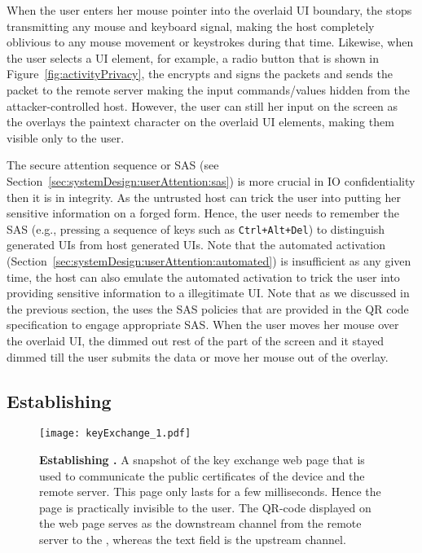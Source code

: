  When the user enters her mouse pointer into the overlaid UI boundary, the \device stops transmitting any mouse and keyboard signal, making the host completely oblivious to any mouse movement or keystrokes during that time. Likewise, when the user selects a UI element, for example, a radio button that is shown in Figure~\ref{fig:activityPrivacy}, the \device encrypts and signs the packets and sends the packet to the remote server making the input commands/values hidden from the attacker-controlled host. However, the user can still her input on the screen as the \device overlays the paintext character on the overlaid UI elements, making them visible only to the user. 

 The secure attention sequence or SAS (see Section~\ref{sec:systemDesign:userAttention:sas}) is more crucial in IO confidentiality then it is in integrity. As the untrusted host can trick the user into putting her sensitive information on a forged form. Hence, the user needs to remember the SAS (e.g., pressing a sequence of keys such as \texttt{Ctrl+Alt+Del}) to distinguish \device generated UIs from host generated UIs. Note that the automated activation (Section~\ref{sec:systemDesign:userAttention:automated}) is insufficient as any given time, the host can also emulate the automated activation to trick the user into providing sensitive information to a illegitimate UI. Note that as we discussed in the previous section, the \device uses the SAS policies that are provided in the QR code specification to engage appropriate SAS. When the user moves her mouse over the overlaid UI, the \device dimmed out rest of the part of the screen and it stayed dimmed till the user submits the data or move her mouse out of the overlay.


\subsection{Establishing \tls}
\label{sec:confidentiality:tls}

\begin{figure}[t]
\centering
\texttt{[image: keyExchange\_1.pdf]}
\caption{\textbf{Establishing \tls.} A snapshot of the key exchange web page that is used to communicate the public certificates of the device and the remote server. This page only lasts for a few milliseconds. Hence the page is practically invisible to the user. The QR-code displayed on the web page serves as the downstream channel from the remote server to the \device, whereas the text field is the upstream channel.}
\spacesave
\label{fig:keyExchange}
\centering
\end{figure} 

